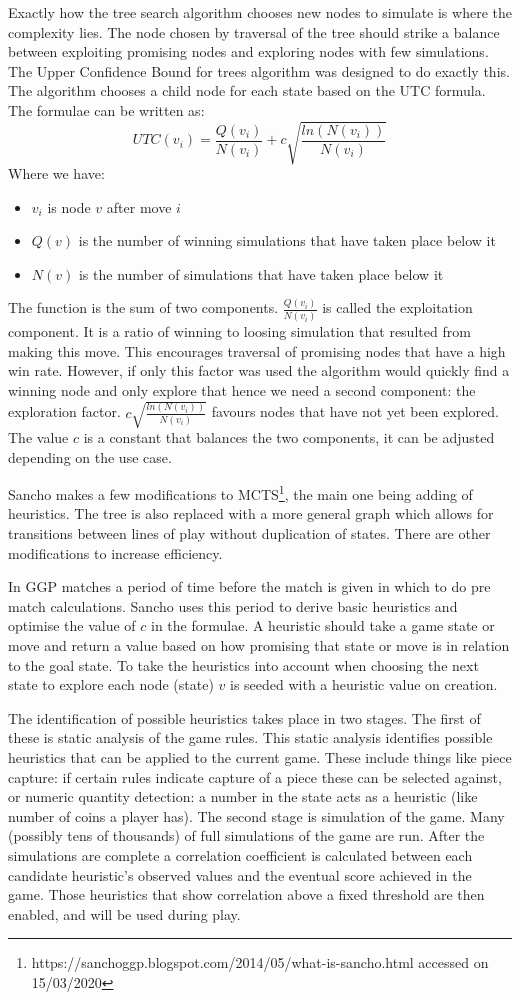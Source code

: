 \documentclass[a4paper,12pt]{report}
\begin{document}
Exactly how the tree search algorithm chooses new nodes to simulate is where the complexity lies. The node chosen by traversal of the tree should strike a balance between exploiting promising nodes and exploring nodes with few simulations. The Upper Confidence Bound for trees algorithm was designed to do exactly this\cite{Kocsis/UCT}. The algorithm chooses a child node for each state based on the UTC formula. The formulae can be written as: \[UTC(v_i) = \frac{Q(v_i)}{N(v_i)} + c\sqrt{\frac{ln(N(v_i))}{N(v_i)}}\] Where we have:
\begin{itemize}
\item $v_i$ is node $v$ after move $i$
\item $Q(v)$ is the number of winning simulations that have taken place below it
\item $N(v)$ is the number of simulations that have taken place below it
\end{itemize}
The function is the sum of two components. $\frac{Q(v_i)}{N(v_i)}$ is called the exploitation component. It is a ratio of winning to loosing simulation that resulted from making this move. This encourages traversal of promising nodes that have a high win rate. However, if only this factor was used the algorithm would quickly find a winning node and only explore that hence we need a second component: the exploration factor. $c\sqrt{\frac{ln(N(v_i))}{N(v_i)}}$ favours nodes that have not yet been explored. The value $c$ is a constant that balances the two components, it can be adjusted depending on the use case.

Sancho makes a few modifications to MCTS\footnote{https://sanchoggp.blogspot.com/2014/05/what-is-sancho.html accessed on 15/03/2020}, the main one being adding of heuristics. The tree is also replaced with a more general graph which allows for transitions between lines of play without duplication of states. There are other modifications to increase efficiency.

In GGP matches a period of time before the match is given in which to do pre match calculations. Sancho uses this period to derive basic heuristics and optimise the value of $c$ in the formulae. A heuristic should take a game state or move and return a value based on how promising that state or move is in relation to the goal state. To take the heuristics into account when choosing the next state to explore each node (state) $v$ is seeded with a heuristic value on creation.

The identification of possible heuristics takes place in two stages. The first of these is static analysis of the game rules. This static analysis identifies possible heuristics that can be applied to the current game. These include things like piece capture: if certain rules indicate capture of a piece these can be selected against, or numeric quantity detection: a number in the state acts as a heuristic (like number of coins a player has). The second stage is simulation of the game. Many (possibly tens of thousands) of full simulations of the game are run. After the simulations are complete a correlation coefficient is calculated between each candidate heuristic's observed values and the eventual score achieved in the game. Those heuristics that show correlation above a fixed threshold are then enabled, and will be used during play.
\end{document}
